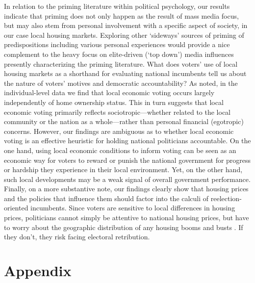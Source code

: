 \documentclass[12pt,a4paper]{article}
\begin{document}
	
	In relation to the priming literature within political psychology, our results indicate that priming does not only happen as the result of mass media focus, but may also stem from personal involvement with a specific aspect of society, in our case local housing markets. Exploring other `sideways’ sources of priming of predispositions including various personal experiences would provide a nice complement to the heavy focus on elite-driven (‘top down’) media influences presently characterizing the priming literature. 
	What does voters’ use of local housing markets as a shorthand for evaluating national incumbents tell us about the nature of voters’ motives and democratic accountability? As noted, in the individual-level data we find that local economic voting occurs largely independently of home ownership status. This in turn suggests that local economic voting primarily reflects sociotropic—whether related to the local community or the nation as a whole—rather than personal financial (egotropic) concerns. However, our findings are ambiguous as to whether local economic voting is an effective heuristic for holding national politicians accountable. On the one hand, using local economic conditions to inform voting can be seen as an economic way for voters to reward or punish the national government for progress or hardship they experience in their local environment. Yet, on the other hand, such local developments may be a weak signal of overall government performance.
	Finally, on a more substantive note, our findings clearly show that housing prices and the policies that influence them should factor into the calculi of reelection-oriented incumbents. Since voters are sensitive to local differences in housing prices, politicians cannot simply be attentive to national housing prices, but have to worry about the geographic distribution of any housing booms and busts \citep[11]{ferejohn1986incumbent}. If they don’t, they risk facing electoral retribution.
	
	
	
	
	\clearpage
	
	\singlespacing
	
	
	
	
	\newpage
	
	\appendix
	\section*{Appendix}
		\onehalfspacing
	\renewcommand{\thesubsection}{\Alph{subsection}}
	\renewcommand{\thetable}{\Alph{subsection}\arabic{table}}
	\renewcommand{\thefigure}{\Alph{subsection}\arabic{figure}}
	
\end{document}
